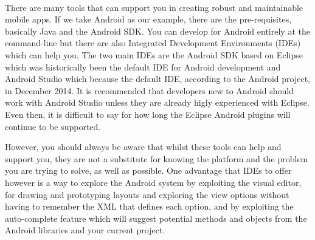\documentclass[12pt, a4paper, twoside]{book}
\begin{document}
\paragraph{} There are many tools that can support you in creating robust and maintainable mobile apps. If we take Android as our example, there are the pre-requisites, basically Java and the Android SDK. You can develop for Android entirely at the command-line but there are also Integrated Development Environments (IDEs) which can help you. The two main IDEs are the Android SDK based on Eclipse which was historically been the default IDE for Android development and Android Studio which because the default IDE, according to the Android project, in December 2014. It is recommended that developers new to Android should work with Android Studio unless they are already higly experienced with Eclipse. Even then, it is difficult to say for how long the Eclipse Android plugins will continue to be supported.

However, you should always be aware that whilst these tools can help and support you, they are not a substitute for knowing the platform and the problem you are trying to solve, as well as possible. One advantage that IDEs to offer however is a way to explore the Android system by exploiting the visual editor, for drawing and prototyping layouts and exploring the view options without having to remember the XML that defines each option, and by exploiting the auto-complete feature which will suggest potential methods and objects from the Android libraries and your current project.


\end{document}
